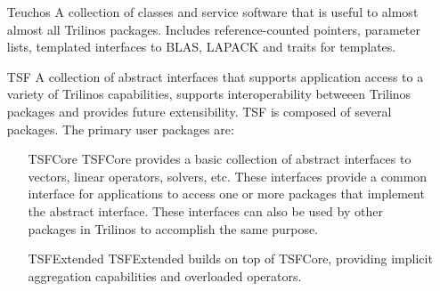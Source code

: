\begin{itemize}
\begin{itemize}
\end{itemize}

\item[Teuchos] A collection of classes and service software that is
useful to almost almost all Trilinos packages.  Includes
reference-counted pointers, parameter lists, templated interfaces to
BLAS, LAPACK and traits for templates.  

\item[TSF] A collection of abstract interfaces that supports application
access to a variety of Trilinos capabilities, supports
interoperability betweeen Trilinos packages and provides future extensibility.
TSF is composed of several packages.  The primary user packages are:  
\begin{itemize}

\item[TSFCore] TSFCore provides 
a basic collection of abstract interfaces to vectors, linear
operators, solvers, etc.  These interfaces provide a common
interface for applications to access one or more packages that
implement the abstract interface.  These interfaces can also be used
by other packages in Trilinos to accomplish the same purpose.

\item[TSFExtended] TSFExtended builds on top of TSFCore, providing implicit
aggregation capabilities and overloaded operators.  
\end{itemize}
\end{itemize}

